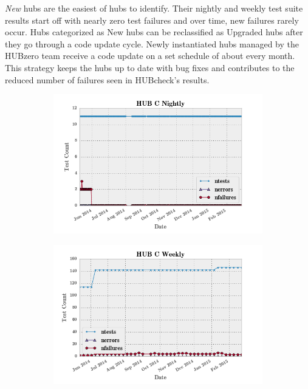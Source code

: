 % 

\textit{New} hubs are the easiest of hubs to identify. Their nightly and weekly
test suite results start off with nearly zero test failures and over time, new
failures rarely occur. Hubs categorized as New hubs can be reclassified as
Upgraded hubs after they go through a code update cycle. Newly instantiated
hubs managed by the HUBzero team receive a code update on a set schedule of
about every month. This strategy keeps the hubs up to date with bug fixes and
contributes to the reduced number of failures seen in HUBcheck's results.


\begin{figure}[ht!]
        \centering
        \begin{subfigure}[b]{0.65\textwidth}
                \centering
                \includegraphics[width=\textwidth]{../../images/summary_plots/hub_c_nightly.png}
        \end{subfigure}
        \begin{subfigure}[b]{0.65\textwidth}
                \centering
                \includegraphics[width=\textwidth]{../../images/summary_plots/hub_c_weekly.png}

\end{subfigure}
\end{figure}
